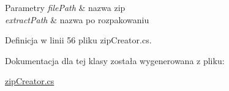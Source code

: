 \begin{DoxyParams}{Parametry}
{\em file\+Path} & nazwa zip\\
\hline
{\em extract\+Path} & nazwa po rozpakowaniu\\
\hline
\end{DoxyParams}


Definicja w linii 56 pliku zip\+Creator.\+cs.



Dokumentacja dla tej klasy została wygenerowana z pliku\+:\begin{DoxyCompactItemize}
\item 
\hyperlink{zip_creator_8cs}{zip\+Creator.\+cs}\end{DoxyCompactItemize}

